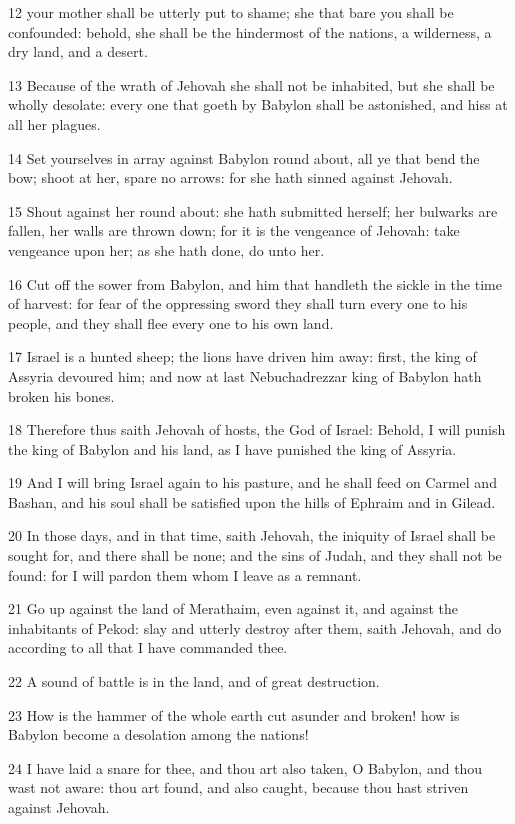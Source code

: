 \par 12 your mother shall be utterly put to shame; she that bare you shall be confounded: behold, she shall be the hindermost of the nations, a wilderness, a dry land, and a desert.
\par 13 Because of the wrath of Jehovah she shall not be inhabited, but she shall be wholly desolate: every one that goeth by Babylon shall be astonished, and hiss at all her plagues.
\par 14 Set yourselves in array against Babylon round about, all ye that bend the bow; shoot at her, spare no arrows: for she hath sinned against Jehovah.
\par 15 Shout against her round about: she hath submitted herself; her bulwarks are fallen, her walls are thrown down; for it is the vengeance of Jehovah: take vengeance upon her; as she hath done, do unto her.
\par 16 Cut off the sower from Babylon, and him that handleth the sickle in the time of harvest: for fear of the oppressing sword they shall turn every one to his people, and they shall flee every one to his own land.
\par 17 Israel is a hunted sheep; the lions have driven him away: first, the king of Assyria devoured him; and now at last Nebuchadrezzar king of Babylon hath broken his bones.
\par 18 Therefore thus saith Jehovah of hosts, the God of Israel: Behold, I will punish the king of Babylon and his land, as I have punished the king of Assyria.
\par 19 And I will bring Israel again to his pasture, and he shall feed on Carmel and Bashan, and his soul shall be satisfied upon the hills of Ephraim and in Gilead.
\par 20 In those days, and in that time, saith Jehovah, the iniquity of Israel shall be sought for, and there shall be none; and the sins of Judah, and they shall not be found: for I will pardon them whom I leave as a remnant.
\par 21 Go up against the land of Merathaim, even against it, and against the inhabitants of Pekod: slay and utterly destroy after them, saith Jehovah, and do according to all that I have commanded thee.
\par 22 A sound of battle is in the land, and of great destruction.
\par 23 How is the hammer of the whole earth cut asunder and broken! how is Babylon become a desolation among the nations!
\par 24 I have laid a snare for thee, and thou art also taken, O Babylon, and thou wast not aware: thou art found, and also caught, because thou hast striven against Jehovah.
